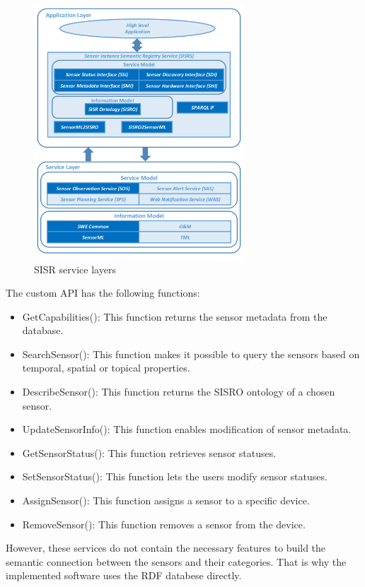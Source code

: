 \begin{figure}[h]
	\centering
	\includegraphics[width=0.7\textwidth]{figures/sisrserv.png}
	\caption{SISR service layers\label{fig:sisrserv}}
\end{figure}
The custom API has the following functions:
\begin{itemize}
\item GetCapabilities(): This function returns the sensor metadata from the database.
\item SearchSensor(): This function makes it possible to query the sensors based on temporal, spatial or topical properties.
\item DescribeSensor(): This function returns the SISRO ontology of a chosen sensor.
\item UpdateSensorInfo(): This function enables modification of sensor metadata.
\item GetSensorStatus(): This function retrieves sensor statuses.
\item SetSensorStatus(): This function lets the users modify sensor statuses.
\item AssignSensor(): This function assigns a sensor to a specific device.
\item RemoveSensor(): This function removes a sensor from the device.
\end{itemize}

However, these services do not contain the necessary features to build the semantic connection between the sensors and their categories. That is why the implemented software uses the RDF databese directly.

